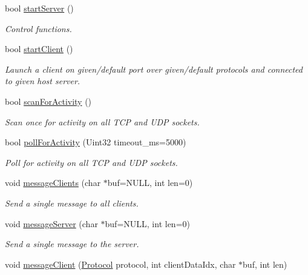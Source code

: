 {\bf }\par
\begin{DoxyCompactItemize}
\item 
bool \hyperlink{classNetManager_ae6a832ed2ede5f5407b75abc584269b8}{start\-Server} ()
\begin{DoxyCompactList}\small\item\em Control functions. \end{DoxyCompactList}\item 
bool \hyperlink{classNetManager_ab5b2ae812e37abbb03be5b604e34a60d}{start\-Client} ()
\begin{DoxyCompactList}\small\item\em Launch a client on given/default port over given/default protocols and connected to given host server. \end{DoxyCompactList}\item 
bool \hyperlink{classNetManager_a934ebfd8ca745a95263ba92c2ccf2b19}{scan\-For\-Activity} ()
\begin{DoxyCompactList}\small\item\em Scan once for activity on all T\-C\-P and U\-D\-P sockets. \end{DoxyCompactList}\item 
bool \hyperlink{classNetManager_ac213dda2e72556e53450d5b1e2057f22}{poll\-For\-Activity} (Uint32 timeout\-\_\-ms=5000)
\begin{DoxyCompactList}\small\item\em Poll for activity on all T\-C\-P and U\-D\-P sockets. \end{DoxyCompactList}\item 
void \hyperlink{classNetManager_aff24a0ce0cf8a4a2450a70ad17e7ec76}{message\-Clients} (char $\ast$buf=N\-U\-L\-L, int len=0)
\begin{DoxyCompactList}\small\item\em Send a single message to all clients. \end{DoxyCompactList}\item 
void \hyperlink{classNetManager_aa4f48b88474c3f6a4422b3a94c07b674}{message\-Server} (char $\ast$buf=N\-U\-L\-L, int len=0)
\begin{DoxyCompactList}\small\item\em Send a single message to the server. \end{DoxyCompactList}\item 
void \hyperlink{classNetManager_a165db41d5fa0692307f11cba589796d0}{message\-Client} (\hyperlink{NetManager_8h_ac5a1bd9a1ae33c413bb774e1ac32501c}{Protocol} protocol, int client\-Data\-Idx, char $\ast$buf, int len)

\end{DoxyCompactItemize}
